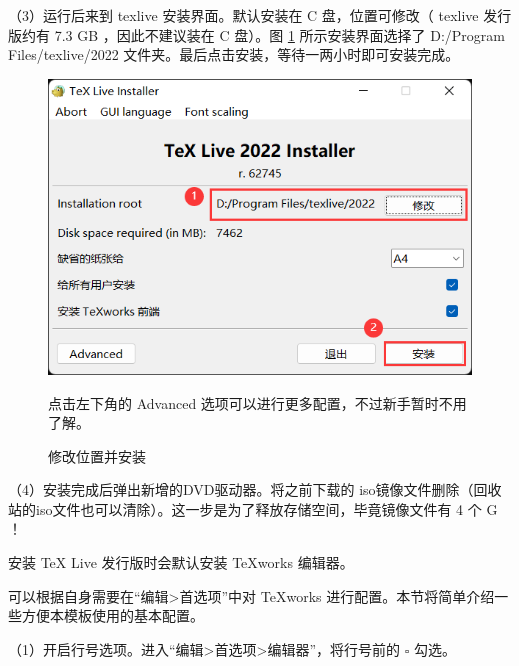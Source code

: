 （3）运行后来到 texlive 安装界面。默认安装在 C 盘，位置可修改（ texlive 发行版约有 7.3 GB ，因此不建议装在 C 盘）。图 \ref{fig:tools:texliveInstaller} 所示安装界面选择了 D:/Program Files/texlive/2022 文件夹。最后点击安装，等待一两小时即可安装完成。

\begin{figure}[H]  %
  \centering  %
  \includegraphics[scale=.5]{figure/texliveInstaller.png}  %

  { 点击左下角的 Advanced 选项可以进行更多配置，不过新手暂时不用了解。}  %
  \caption{修改位置并安装}  %
  \label{fig:tools:texliveInstaller}  %
\end{figure}

（4）安装完成后弹出新增的DVD驱动器。将之前下载的 iso镜像文件删除（回收站的iso文件也可以清除）。这一步是为了释放存储空间，毕竟镜像文件有 4 个 G ！


安装 \TeX{} Live 发行版时会默认安装 \TeX{works} 编辑器。

可以根据自身需要在“编辑>首选项”中对 \TeX{works} 进行配置。本节将简单介绍一些方便本模板使用的基本配置。

（1）开启行号选项。进入“编辑>首选项>编辑器”，将行号前的 $\square$ 勾选。

